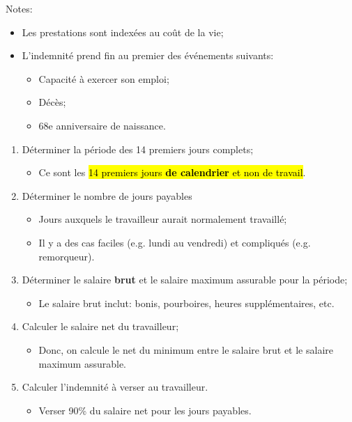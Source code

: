 \documentclass[10pt, french]{article}
\begin{document}
\begin{multicols*}{3}
\begin{definitionNOHFILL}
\tcbline

Notes:
\begin{itemize}[leftmargin = *]
	\item	Les prestations sont indexées au coût de la vie;
	\item	L'indemnité prend fin au premier des événements suivants:
		\begin{itemize}[leftmargin = *]
		\item	Capacité à exercer son emploi;
		\item	Décès;
		\item	68e anniversaire de naissance.
		\end{itemize}
\end{itemize}
\end{definitionNOHFILL}

\begin{algo2}
\begin{enumerate}[leftmargin = *]
	\item	Déterminer la période des 14 premiers jours complets;
		\begin{itemize}[leftmargin = *]
		\item	Ce sont les \hl{14 premiers jours \textbf{de calendrier} et non de travail}.
		\end{itemize}
	\item	Déterminer le nombre de jours payables
		\begin{itemize}[leftmargin = *]
		\item	Jours auxquels le travailleur aurait normalement travaillé;
		\item	Il y a des cas faciles (e.g. lundi au vendredi) et compliqués (e.g. remorqueur).
		\end{itemize}
	\item	Déterminer le salaire \textbf{brut} et le salaire maximum assurable pour la période;
		\begin{itemize}[leftmargin = *]
		\item	Le salaire brut inclut: bonis, pourboires, heures supplémentaires, etc.
		\end{itemize}
	\item	Calculer le salaire net du travailleur;
		\begin{itemize}[leftmargin = *]
		\item	Donc, on calcule le net du minimum entre le salaire brut et le salaire maximum assurable.
		\end{itemize}
	\item	Calculer l’indemnité à verser au travailleur.
		\begin{itemize}[leftmargin = *]
		\item	Verser 90\% du salaire net pour les jours payables.
		\end{itemize}
\end{enumerate}


\end{algo2}
\end{multicols*}
\end{document}
